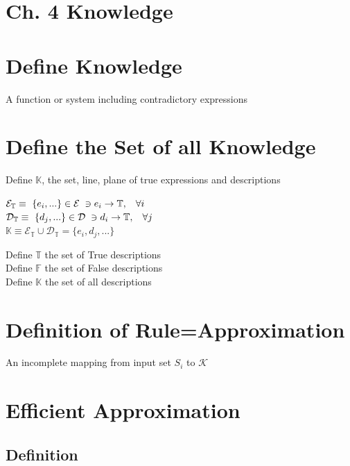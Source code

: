 \documentclass[11pt]{article}
\begin{document}
\section*{Ch. 4 Knowledge}


\section{Define Knowledge}
A function or system including contradictory expressions


\section{Define the Set of all Knowledge}
Define $\mathbb{K}$, the set, line, plane of true expressions and descriptions
\begin{center}
$
\mathcal{E_{\mathbb{T}}} \equiv \ \{e_i,...\} \in \mathcal{E} \hspace{1mm} \ni e_i \rightarrow \mathbb{T}, \hspace{3mm} \forall i
$
\\
$
\mathcal{D_{\mathbb{T}}} \equiv \ \{d_j,...\} \in \mathcal{D} \hspace{1mm} \ni d_i \rightarrow \mathbb{T}, \hspace{3mm} \forall j
$
\\
$
\mathbb{K} \equiv \mathcal{E_{\mathbb{T}}} \cup \mathcal{D_{\mathbb{T}}} =  \{e_i, d_j,...\}
$
\end{center}


Define $\mathbb{T}$ the set of True descriptions\\
Define $\mathbb{F}$ the set of False descriptions\\
Define $\mathbb{K}$ the set of all descriptions










\section{Definition of Rule=Approximation}
An incomplete mapping from input set $S_i$ to $\mathcal{K}$






\section*{Efficient Approximation}
\subsection{Definition}
\end{document}

